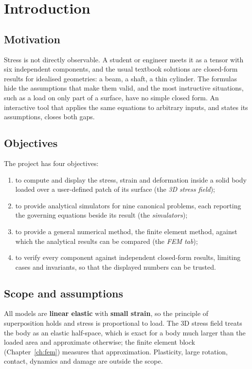 \chapter{Introduction}
\label{ch:intro}

\section{Motivation}
Stress is not directly observable. A student or engineer meets it as a tensor with six independent components, and the usual textbook solutions are closed-form results for idealised geometries: a beam, a shaft, a thin cylinder. The formulas hide the assumptions that make them valid, and the most instructive situations, such as a load on only part of a surface, have no simple closed form. An interactive tool that applies the same equations to arbitrary inputs, and states its assumptions, closes both gaps.

\section{Objectives}
The project has four objectives:
\begin{enumerate}[nosep]
\item to compute and display the stress, strain and deformation inside a solid body loaded over a user-defined patch of its surface (the \emph{3D stress field});
\item to provide analytical simulators for nine canonical problems, each reporting the governing equations beside its result (the \emph{simulators});
\item to provide a general numerical method, the finite element method, against which the analytical results can be compared (the \emph{FEM tab});
\item to verify every component against independent closed-form results, limiting cases and invariants, so that the displayed numbers can be trusted.
\end{enumerate}

\section{Scope and assumptions}
All models are \textbf{linear elastic} with \textbf{small strain}, so the principle of superposition holds and stress is proportional to load. The 3D stress field treats the body as an elastic half-space, which is exact for a body much larger than the loaded area and approximate otherwise; the finite element block (Chapter~\ref{ch:fem}) measures that approximation. Plasticity, large rotation, contact, dynamics and damage are outside the scope.

